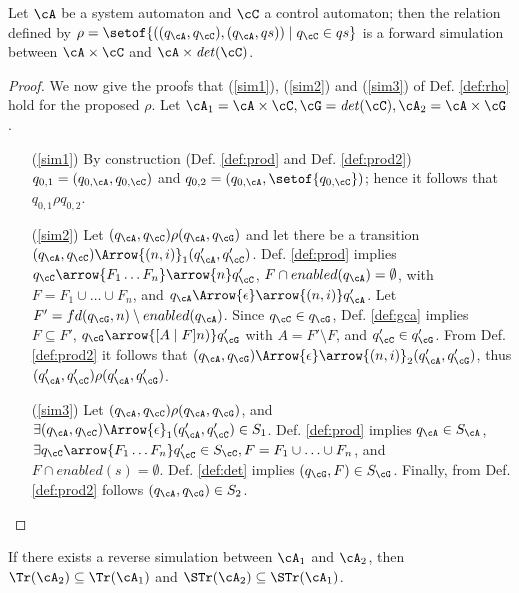 %
\begin{proposition}
Let $\cA$ be a system automaton and $\cC$ a control automaton; then the relation defined by $\rho = \setof{((q_\cA,q_\cC),(q_\cA,qs)) \mid q_\cC \in qs}$ is a forward simulation between $\cA \times \cC$ and $\cA \times \mathit{det}(\cC)$.
\end{proposition}
%
\begin{proof}
We now give the proofs that (\ref{sim1}), (\ref{sim2}) and (\ref{sim3}) of Def. \ref{def:rho} hold for the proposed $\rho$. Let $\cA_1 = \cA \times \cC, \cG = \mathit{det}(\cC), \cA_2 = \cA \times \cG$.
%
\begin{itemize}
\item[(\ref{sim1})]
By construction (Def. \ref{def:prod} and Def. \ref{def:prod2})
$q_{0,1} = (q_{0,\cA},q_{0,\cC})$ and $q_{0,2} = (q_{0,\cA}, \setof{q_{0,\cC}})$; hence it follows that $q_{0,1} \rho q_{0,2}$. 
%
\item[(\ref{sim2})]
Let $(q_\cA,q_\cC) \rho (q_\cA,q_\cG)$ and
let there be a transition $(q_\cA,q_\cC) \Arrow{(n,i)}_1 (q_{\cA}',q_{\cC}')$.
Def. \ref{def:prod} implies
$q_\cC \arrow{F_1 \dotsc F_n}\arrow{n} q_{\cC}'$, $F \cap enabled(q_{\cA}) = \emptyset$, with $F = F_1 \cup \dotsc \cup F_n$, and $q_\cA \Arrow{\epsilon}\arrow{(n,i)} q_{\cA}'$.
Let $F' = fd(q_{\cG},n) \setminus enabled(q_{\cA})$. Since $q_{\cC} \in q_{\cG}$, Def. \ref{def:gca} implies $F \subseteq F'$, $q_{\cG} \arrow{[A \mid F]n)} q_{\cG}'$ with $A = F' \setminus F$, and $q_{\cC}' \in q_{\cG}'$. From Def. \ref{def:prod2} it follows that $(q_{\cA},q_{\cG}) \Arrow{\epsilon}\arrow{(n,i)}_2 (q_{\cA}',q_{\cG}')$, thus $(q_{\cA}',q_{\cC}') \rho (q_{\cA}',q_{\cG}')$.
%
\item[(\ref{sim3})]
Let $(q_\cA,q_\cC) \rho (q_\cA,q_\cG)$, and $\exists (q_\cA,q_\cC) \Arrow{\epsilon}_1 (q_{\cA}',q_{\cC}') \in S_1$.
Def. \ref{def:prod} implies $q_{\cA} \in S_\cA$, $\exists q_\cC \arrow{F_1 \dotsc F_n} q_{\cC}' \in S_\cC, F = F_1 \cup \dotsc \cup F_n$, and $F \cap enabled(s) = \emptyset$. Def. \ref{def:det} implies $(q_\cG,F) \in S_{\cG}$. Finally, from Def. \ref{def:prod2} follows $(q_\cA,q_\cG) \in S_2$.
\end{itemize}
\end{proof}
%
\begin{proposition}
If there exists a reverse simulation between $\cA_1$ and $\cA_2$, then $\Tr(\cA_2) \subseteq \Tr(\cA_1)$ and $\STr(\cA_2) \subseteq \STr(\cA_1)$.
\end{proposition}
%
